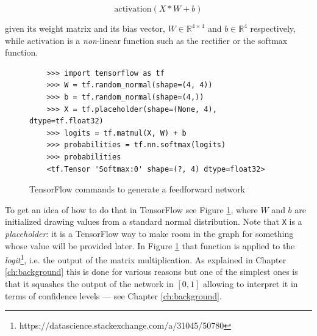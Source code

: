 \[ \text{activation}(X * W + b) \]

given its weight matrix and its bias vector, \( W \in \mathbb{R}^{4
  \times 4} \) and \( b \in \mathbb{R}^{4}\) respectively, while
\( \text{activation} \) is a \emph{non}-linear function such as
the rectifier or the softmax function.

\begin{figure}
  \begin{verbatim}
    >>> import tensorflow as tf
    >>> W = tf.random_normal(shape=(4, 4))
    >>> b = tf.random_normal(shape=(4,))
    >>> X = tf.placeholder(shape=(None, 4), dtype=tf.float32)
    >>> logits = tf.matmul(X, W) + b
    >>> probabilities = tf.nn.softmax(logits)
    >>> probabilities
    <tf.Tensor 'Softmax:0' shape=(?, 4) dtype=float32>
  \end{verbatim}
  \caption{TensorFlow commands to generate a feedforward network}
  \label{fig:tensorflow-feedforward}
\end{figure}

To get an idea of how to do that in TensorFlow see Figure
\ref{fig:tensorflow-feedforward}, where $W$ and $b$ are initialized
drawing values from a standard normal distribution. Note that
\texttt{X} is a \emph{placeholder}: it is a TensorFlow way to make room
in the graph for something whose value will be provided later. In
Figure \ref{fig:tensorflow-feedforward} that function is applied to the
\emph{logit}\footnote{https://datascience.stackexchange.com/a/31045/50780},
i.e. the output of the matrix multiplication. As explained in Chapter
\ref{ch:background} this is done for various reasons but one of the
simplest ones is that it squashes the output of the network in $[0,1]$
allowing to interpret it in terms of confidence levels --- see Chapter
\ref{ch:background}.

